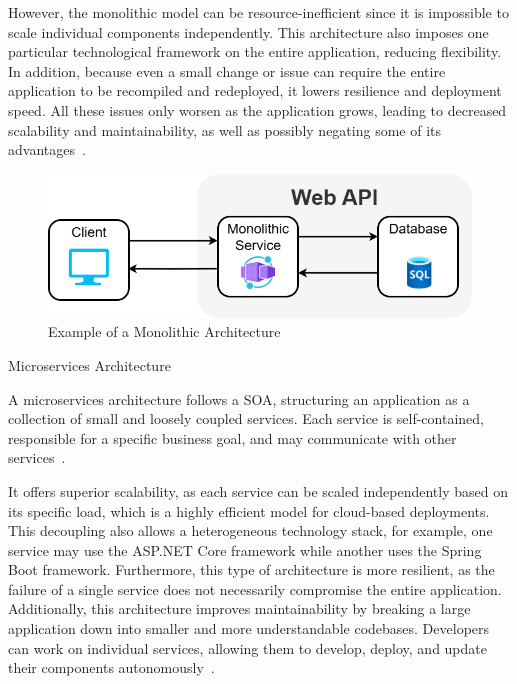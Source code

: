 \documentclass[12pt, reqno, oneside]{amsbook}
\makeatletter
\def\subsection{\@startsection{subsection}{2}%
      \z@{.5\linespacing\@plus.7\linespacing}{.25\linespacing}%
      {\normalfont\bfseries\flushleft}}
\theoremstyle{definition}
\theoremstyle{definition}
\numberwithin{section}{chapter}
\numberwithin{table}{chapter}
\numberwithin{figure}{chapter}
\makeatother
\begin{document}
However, the monolithic model can be resource-inefficient since it is impossible to scale individual components independently. This architecture also imposes one particular technological framework on the entire application, reducing flexibility. In addition, because even a small change or issue can require the entire application to be recompiled and redeployed, it lowers resilience and deployment speed. All these issues only worsen as the application grows, leading to decreased scalability and maintainability, as well as possibly negating some of its advantages~\cite{Taibi2018, Adrio2023, Moysiadis2022, Figueira2024, Kenan2020, Villamizar2015}.

\FloatBarrier
\begin{figure}[H]
  \includegraphics[width=0.9\linewidth]{images/MonolithicArchitecture.png}
  \caption{\label{Figure:Monolithic_Architecture}Example of a Monolithic Architecture}
\end{figure}
\FloatBarrier

\pagebreak

\subsection{Microservices Architecture}
\label{Subsection:Microservices_Architecture}

A microservices architecture follows a \ac{SOA}, structuring an application as a collection of small and loosely coupled services. Each service is self-contained, responsible for a specific business goal, and may communicate with other services~\cite{Taibi2018, Adrio2023, Moysiadis2022, Khalfaoui2025, Figueira2024, Kenan2020}.

It offers superior scalability, as each service can be scaled independently based on its specific load, which is a highly efficient model for cloud-based deployments. This decoupling also allows a heterogeneous technology stack, for example, one service may use the ASP.NET Core framework while another uses the Spring Boot framework. Furthermore, this type of architecture is more resilient, as the failure of a single service does not necessarily compromise the entire application. Additionally, this architecture improves maintainability by breaking a large application down into smaller and more understandable codebases. Developers can work on individual services, allowing them to develop, deploy, and update their components autonomously~\cite{Taibi2018, Adrio2023, Moysiadis2022, Khalfaoui2025, Figueira2024, Kenan2020, Villamizar2015}.
\end{document}
